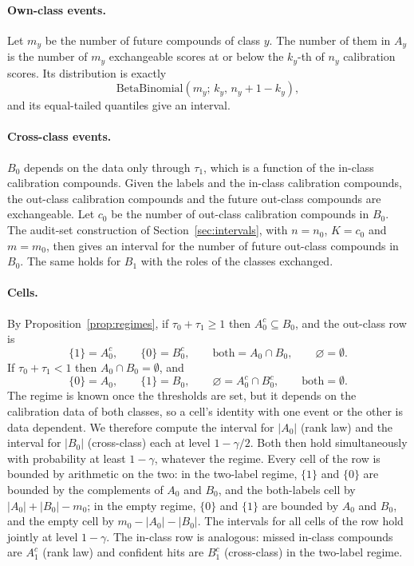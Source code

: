 \documentclass[10pt]{article}
\begin{document}
\paragraph{Own-class events.} Let $m_y$ be the number of future compounds of class $y$. The number of them in $A_y$ is the number of $m_y$ exchangeable scores at or below the $k_y$-th of $n_y$ calibration scores. Its distribution is exactly\citep{Marques2025Beta}
\begin{equation}
\mathrm{BetaBinomial}(m_y;\,k_y,\,n_y+1-k_y),
\end{equation}
and its equal-tailed quantiles give an interval.

\paragraph{Cross-class events.} $B_0$ depends on the data only through $\tau_1$, which is a function of the in-class calibration compounds. Given the labels and the in-class calibration compounds, the out-class calibration compounds and the future out-class compounds are exchangeable. Let $c_0$ be the number of out-class calibration compounds in $B_0$. The audit-set construction of Section~\ref{sec:intervals}, with $n=n_0$, $K=c_0$ and $m=m_0$, then gives an interval for the number of future out-class compounds in $B_0$. The same holds for $B_1$ with the roles of the classes exchanged.

\paragraph{Cells.} By Proposition~\ref{prop:regimes}, if $\tau_0+\tau_1\ge1$ then $A_0^c\subseteq B_0$, and the out-class row is
\begin{equation}
\{1\}=A_0^c,\qquad \{0\}=B_0^c,\qquad \text{both}=A_0\cap B_0,\qquad \varnothing=\emptyset .
\end{equation}
If $\tau_0+\tau_1<1$ then $A_0\cap B_0=\emptyset$, and
\begin{equation}
\{0\}=A_0,\qquad \{1\}=B_0,\qquad \varnothing=A_0^c\cap B_0^c,\qquad \text{both}=\emptyset .
\end{equation}
The regime is known once the thresholds are set, but it depends on the calibration data of both classes, so a cell's identity with one event or the other is data dependent. We therefore compute the interval for $|A_0|$ (rank law) and the interval for $|B_0|$ (cross-class) each at level $1-\gamma/2$. Both then hold simultaneously with probability at least $1-\gamma$, whatever the regime. Every cell of the row is bounded by arithmetic on the two: in the two-label regime, $\{1\}$ and $\{0\}$ are bounded by the complements of $A_0$ and $B_0$, and the both-labels cell by $|A_0|+|B_0|-m_0$; in the empty regime, $\{0\}$ and $\{1\}$ are bounded by $A_0$ and $B_0$, and the empty cell by $m_0-|A_0|-|B_0|$. The intervals for all cells of the row hold jointly at level $1-\gamma$. The in-class row is analogous: missed in-class compounds are $A_1^c$ (rank law) and confident hits are $B_1^c$ (cross-class) in the two-label regime.
\end{document}

